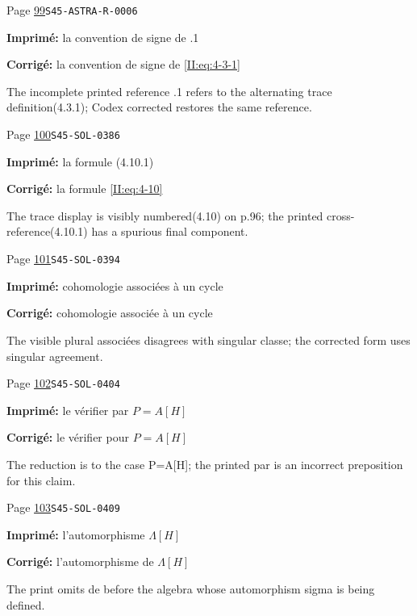 \begin{description}
\smallskip
\item[\hypertarget{apparatus:FR-0054}{54}] Page \hyperlink{printpage:fr:99}{99}\quad\texttt{S45-ASTRA-R-0006}
\par\noindent\textbf{Imprimé:} la convention de signe de .1
\par\noindent\textbf{Corrigé:} la convention de signe de \ref{II:eq:4-3-1}
\par\noindent The incomplete printed reference .1 refers to the alternating trace definition(4.3.1); Codex corrected restores the same reference.
\smallskip
\item[\hypertarget{apparatus:FR-0055}{55}] Page \hyperlink{printpage:fr:100}{100}\quad\texttt{S45-SOL-0386}
\par\noindent\textbf{Imprimé:} la formule (4.10.1)
\par\noindent\textbf{Corrigé:} la formule \eqref{II:eq:4-10}
\par\noindent The trace display is visibly numbered(4.10) on p.96; the printed cross-reference(4.10.1) has a spurious final component.
\smallskip
\item[\hypertarget{apparatus:FR-0056}{56}] Page \hyperlink{printpage:fr:101}{101}\quad\texttt{S45-SOL-0394}
\par\noindent\textbf{Imprimé:} cohomologie associées à un cycle
\par\noindent\textbf{Corrigé:} cohomologie associée à un cycle
\par\noindent The visible plural associées disagrees with singular classe; the corrected form uses singular agreement.
\smallskip
\item[\hypertarget{apparatus:FR-0057}{57}] Page \hyperlink{printpage:fr:102}{102}\quad\texttt{S45-SOL-0404}
\par\noindent\textbf{Imprimé:} le vérifier par $P=A[H]$
\par\noindent\textbf{Corrigé:} le vérifier pour $P=A[H]$
\par\noindent The reduction is to the case P=A[H]; the printed par is an incorrect preposition for this claim.
\smallskip
\item[\hypertarget{apparatus:FR-0058}{58}] Page \hyperlink{printpage:fr:103}{103}\quad\texttt{S45-SOL-0409}
\par\noindent\textbf{Imprimé:} l'automorphisme $\Lambda[H]$
\par\noindent\textbf{Corrigé:} l'automorphisme de $\Lambda[H]$
\par\noindent The print omits de before the algebra whose automorphism sigma is being defined.

\end{description}
